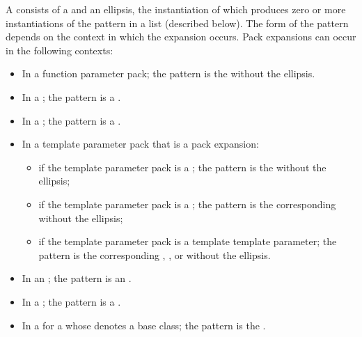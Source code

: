 \pnum
{}%
A 
consists of a  and an ellipsis, the instantiation of which
produces zero or more instantiations of the pattern in a list (described below).
The form of the pattern
depends on the context in which the expansion occurs. Pack
expansions can occur in the following contexts:

\begin{itemize}
\item In a function parameter pack; the pattern is the
 without the ellipsis.

\item In a ;
the pattern is a .

\item In a ;
the pattern is a .

\item In a template parameter pack that is a pack expansion:
\begin{itemize}
\item
if the template parameter pack is a ;
the pattern is the  without the ellipsis;

\item
if the template parameter pack is a ;
the pattern is the corresponding 
without the ellipsis;

\item
if the template parameter pack is a template template parameter;
the pattern is the corresponding
,
, or
without the ellipsis.
\end{itemize}

\item In an ;
the pattern is an .

\item In a ;
the pattern is a .

\item In a  for a
 whose  denotes a
base class; the pattern is the .


\end{itemize}
